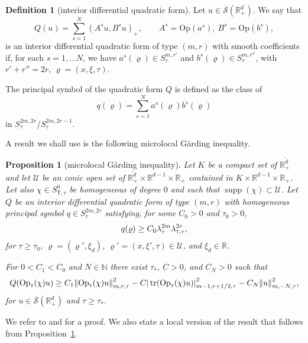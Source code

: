 \documentclass[JEP,XML,SOM,Unicode,published]{cedram}
\theoremstyle{plain}
\newtheorem{proposition}[theorem]{Proposition}
\theoremstyle{definition}
\newtheorem{definition}[theorem]{Definition}
\def\R{\mathbb{R}}
\def\N{\mathbb{N}}
\let\y\varrho
\let \Re \relax
\DeclareMathOperator{\Re}{Re}
\newcommand{\ovl}[1]{\overline{#1}}
\newcommand{\inp}[2]{(#1, #2)}
\newcommand{\U}{\mathscr U}
\newcommand{\Op}{\ensuremath{\mathrm{Op}}}
\newcommand{\Opt}{\ensuremath{\mathrm{Op}_{\scriptscriptstyle{\mathsf{T}}}}}
\newcommand{\Normsc}[2]{{\| #1 \|}_{#2, \tau}}
\newcommand{\normsc}[2]{{| #1 |}_{#2, \tau}}
\newcommand{\lsc}{\lambda_\tau}
\newcommand{\lsct}{\lambda_{{\scriptscriptstyle{\mathsf T}},\tau}}
\newcommand{\Ssc}{S_\tau}
\newcommand{\Ssct}{S_{{\scriptscriptstyle{\mathsf T}},\tau}}
\newcommand{\Sbarp}{\ensuremath{\overline{\mathscr{S}}(\Rdp)}}
\newcommand{\Rdp}{\R^d_+}
\DeclareMathOperator{\supp}{supp}
\DeclareMathOperator{\trace}{tr}
\begin{document}
\begin{definition}[interior differential quadratic form]
\label{def: interior quadratic form}
Let $u\in \Sbarp$. We say that
\begin{equation}
\label{eq: quadratic form}
Q(u)=\sum_{s=1}^N\inp{A^su}{B^su}_+,
\qquad A^s = \Op(a^s), \
B^s= \Op(b^s),
\end{equation}
is an interior differential quadratic form of type $(m,r)$ with smooth
coefficients if, for each $s=1,\dots N$, we have $a^s(\y)\in
\Ssc^{m,r'}$ and $b^s(\y)\in
\Ssc^{m,r''}$, with $r' + r'' = 2
r$, $\y = (x,\xi,\tau)$.

The principal symbol of the quadratic form $Q$ is defined as the
class of
\begin{equation}
\label{eq: symbol quadratic form}
q(\y)=\sum_{s=1}^N a^{s}(\y)\ovl{b^s}(\y)
\end{equation}
in $\Ssc^{2m,2 r} / \Ssc^{2m,2 r-1}$.
\end{definition}
A result we shall use is the following microlocal G{\aa}rding inequality.

\begin{proposition}[microlocal G{\aa}rding inequality]
\label{prop: Gaarding quadratic forms}
Let $K$ be a compact set of $\ovl{\Rdp}$ and let
$\U$ be an conic open set of $\ovl{\Rdp} \times \R^{d-1} \times
\R_+$ contained in $K \times \R^{d-1} \times
\R_+$.
Let also $\chi \in \Ssct^0$ be homogeneous of degree $0$ and such
that
$\supp (\chi) \subset \U$. Let $Q$ be an interior differential quadratic
form of type $(m,r)$ with homogeneous
principal symbol $q\in \Ssc^{2m,2 r}$ satisfying, for some $C_0>0$
and $\tau_0>0$,
\begin{equation*}
\Re q(\y)\geq C_0 \lsc^{2m} \lsct^{2r},
\end{equation*}
for $\tau \geq \tau_0$, $\y = (\y',\xi_d)$,
$\y'=(x,\xi',\tau)\in\U$, and $\xi_d\in\R$.

For $0< C_1 < C_0$ and $N \in \N$ there exist $\tau_\ast$, $C>0$,
and $C_N>0$ such that
\begin{equation*}
\Re Q(\Opt(\chi) u)
\geq
C_1\Normsc{\Opt(\chi) u}{m,r}^2
-C\normsc{\trace(\Opt(\chi) u)}{m-1,r+1/2}^2- C_N \Normsc{u}{m,-N}^2,
\end{equation*}
for $u\in \Sbarp$ and $\tau\geq \tau_\ast$.
\end{proposition}
We refer to \cite[Prop.\,3.5]{ML} and \cite[Th.\,6.17]{JGL-vol2} for a proof.
We also state a local version of the result that follows from Proposition~\ref{prop: Gaarding quadratic forms}.
\end{document}
